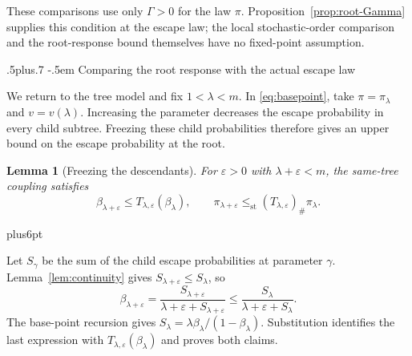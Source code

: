 \documentclass[11pt,reqno]{amsart}
\makeatletter
\def\subsection{\@startsection{subsection}{2}{0pt}%
  {.5\linespacing plus.7\linespacing}
  {-.5em}
  {\normalfont\scshape}}
\theoremstyle{plain}
\newtheorem{lemma}[theorem]{Lemma}
\theoremstyle{definition}
\theoremstyle{remark}
\renewenvironment{proof}[1][\proofname]{%
  \par
  \pushQED{\qed}%
  \normalfont
  \topsep6pt plus6pt\relax
  \trivlist
  \item[\hskip\labelsep\slshape #1\@addpunct{.}]%
  \ignorespaces
}{%
  \popQED
  \endtrivlist
  \@endpefalse
}
\DeclareRobustCommand{\qed}{%
  \leavevmode\unskip\penalty9999\hbox{}\nobreak
  \ifmmode
    \makebox[0pt][l]{\qquad\hbox{\qedsymbol}}%
  \else
    \qquad\hbox{\qedsymbol}%
  \fi
}
\renewcommand{\qedsymbol}{\rule[.47pt]{4pt}{6pt}}
\numberwithin{equation}{section}
\makeatother
\begin{document}
These comparisons use only $\Gamma>0$ for the law $\pi$.
Proposition~\ref{prop:root-Gamma} supplies this condition at the escape
law; the local stochastic-order comparison and the root-response bound
themselves have no fixed-point assumption.

\subsection{Comparing the root response with the actual escape law}

We return to the tree model and fix $1<\lambda<m$. In
\eqref{eq:basepoint}, take $\pi=\pi_\lambda$ and $v=v(\lambda)$. Increasing the parameter decreases the escape
probability in every child subtree. Freezing these child probabilities
therefore gives an upper bound on the escape probability at the root.

\begin{lemma}[Freezing the descendants]\label{lem:root-freezing}
For $\varepsilon>0$ with $\lambda+\varepsilon<m$, the same-tree coupling
satisfies
\begin{equation}\label{eq:root-freezing}
 \beta_{\lambda+\varepsilon}
 \le T_{\lambda,\varepsilon}(\beta_\lambda),\qquad
 \pi_{\lambda+\varepsilon}
 \le_{\mathrm{st}}(T_{\lambda,\varepsilon})_\#\pi_\lambda.
\end{equation}
\end{lemma}

\begin{proof}
Let $S_\gamma$ be the sum of the child escape probabilities at parameter
$\gamma$. Lemma~\ref{lem:continuity} gives
$S_{\lambda+\varepsilon}\le S_\lambda$, so
\[
 \beta_{\lambda+\varepsilon}
 =\frac{S_{\lambda+\varepsilon}}
        {\lambda+\varepsilon+S_{\lambda+\varepsilon}}
 \le\frac{S_\lambda}{\lambda+\varepsilon+S_\lambda}.
\]
The base-point recursion gives
$S_\lambda=\lambda\beta_\lambda/(1-\beta_\lambda)$.
Substitution identifies the last expression with
$T_{\lambda,\varepsilon}(\beta_\lambda)$ and proves both claims.
\end{proof}
\end{document}
